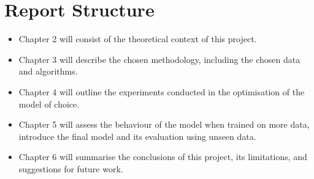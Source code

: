 \section{Report Structure} \label{report_struct}
\begin{itemize}
    \item Chapter 2 will consist of the theoretical context of this project. 
    \item Chapter 3 will describe the chosen methodology, including the chosen data and algorithms. 
    \item Chapter 4 will outline the experiments conducted in the optimisation of the model of choice.
    \item Chapter 5 will assess the behaviour of the model when trained on more data, introduce the final model and its evaluation using unseen data.
    \item Chapter 6 will summarise the conclusions of this project, its limitations, and suggestions for future work.
\end{itemize}
